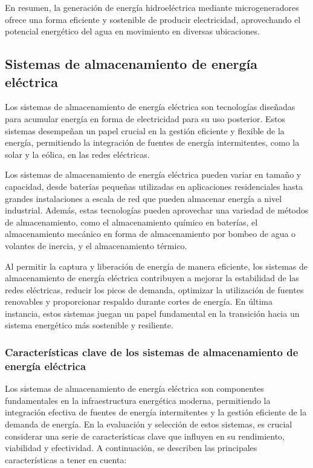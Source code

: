 \documentclass[11pt]{article}
\begin{document}
            En resumen, la generación de energía hidroeléctrica mediante microgeneradores ofrece una
            forma eficiente y sostenible de producir electricidad, aprovechando el potencial energético
            del agua en movimiento en diversas ubicaciones.


            \subsection{Sistemas de almacenamiento de energía eléctrica}
            Los sistemas de almacenamiento de energía eléctrica son tecnologías diseñadas para
            acumular energía en forma de electricidad para su uso posterior. Estos sistemas
            desempeñan un papel crucial en la gestión eficiente y flexible de la energía, permitiendo la
            integración de fuentes de energía intermitentes, como la solar y la eólica, en las redes
            eléctricas.

            Los sistemas de almacenamiento de energía eléctrica pueden variar en tamaño y
            capacidad, desde baterías pequeñas utilizadas en aplicaciones residenciales hasta grandes
            instalaciones a escala de red que pueden almacenar energía a nivel industrial. Además,
            estas tecnologías pueden aprovechar una variedad de métodos de almacenamiento, como
            el almacenamiento químico en baterías, el almacenamiento mecánico en forma de
            almacenamiento por bombeo de agua o volantes de inercia, y el almacenamiento térmico.
            
            Al permitir la captura y liberación de energía de manera eficiente, los sistemas de
            almacenamiento de energía eléctrica contribuyen a mejorar la estabilidad de las redes
            eléctricas, reducir los picos de demanda, optimizar la utilización de fuentes renovables y
            proporcionar respaldo durante cortes de energía. En última instancia, estos sistemas juegan
            un papel fundamental en la transición hacia un sistema energético más sostenible y
            resiliente. 

            \subsubsection{Características clave de los sistemas de almacenamiento de energía eléctrica}
            

            Los sistemas de almacenamiento de energía eléctrica son componentes fundamentales en
            la infraestructura energética moderna, permitiendo la integración efectiva de fuentes de
            energía intermitentes y la gestión eficiente de la demanda de energía. En la evaluación y
            selección de estos sistemas, es crucial considerar una serie de características clave que
            influyen en su rendimiento, viabilidad y efectividad. A continuación, se describen las
            principales características a tener en cuenta:
\end{document}
